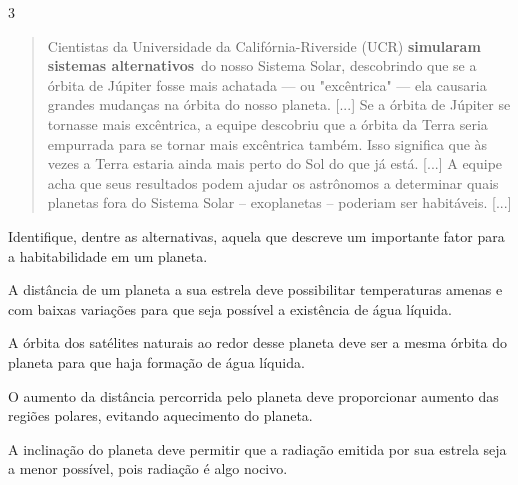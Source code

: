 
\num{3}

\begin{quote}
Cientistas da Universidade da Califórnia-Riverside
(UCR) \textbf{simularam sistemas alternativos}~do nosso Sistema Solar,
descobrindo que se a órbita de Júpiter fosse mais achatada --- ou
"excêntrica" --- ela causaria grandes mudanças na órbita do nosso planeta. [...]
Se a órbita de Júpiter se tornasse mais excêntrica, a equipe
descobriu que a órbita da Terra seria empurrada para se tornar mais
excêntrica também. Isso significa que às vezes a Terra estaria ainda
mais perto do Sol do que já está. [...]
A equipe acha que seus resultados
podem ajudar os astrônomos a determinar quais planetas fora do Sistema
Solar -- exoplanetas -- poderiam ser habitáveis. [...]

\end{quote}

Identifique, dentre as alternativas, aquela que descreve um importante
fator para a habitabilidade em um planeta.

\begin{escolha}
\item
  A distância de um planeta a sua estrela deve possibilitar temperaturas
  amenas e com baixas variações para que seja possível a existência de
  água líquida.
\item
  A órbita dos satélites naturais ao redor desse planeta deve ser a
  mesma órbita do planeta para que haja formação de água líquida.
\item
  O aumento da distância percorrida pelo planeta deve proporcionar
  aumento das regiões polares, evitando aquecimento do planeta.
\item
  A inclinação do planeta deve permitir que a radiação emitida por sua
  estrela seja a menor possível, pois radiação é algo nocivo.
\end{escolha}

